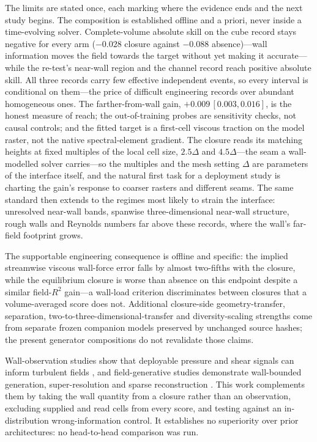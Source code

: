 The limits are stated once, each marking where the evidence ends and the next study begins. The
composition is established offline and a priori, never inside a time-evolving solver.
Complete-volume absolute skill on the cube record stays negative for every
arm ($-0.028$ closure against $-0.088$ absence)---wall information moves the field towards the
target without yet making it accurate---while the re-test's near-wall region and the channel
record reach positive absolute skill. All three records carry few effective independent events,
so every interval is conditional on them---the price of difficult engineering records over
abundant homogeneous ones. The farther-from-wall gain, $+0.009\,[0.003,0.016]$, is
the honest measure of reach; the out-of-training probes are sensitivity checks, not causal
controls; and the fitted target is a first-cell viscous traction on the model raster, not the
native spectral-element gradient. The closure reads its matching heights at fixed multiples of
the local cell size, $2.5\Delta$ and $4.5\Delta$---the seam a wall-modelled solver carries---so
the multiples and the mesh setting $\Delta$ are parameters of the interface itself, and the
natural first task for a deployment study is charting the gain's response to coarser rasters and
different seams. The same standard then extends to the regimes most likely to strain the
interface: unresolved near-wall bands, spanwise three-dimensional near-wall structure, rough
walls and Reynolds numbers far above these records, where the wall's far-field footprint
grows.

The supportable engineering consequence is offline and specific: the implied streamwise viscous
wall-force error falls by almost two-fifths with the closure, while the equilibrium closure is
worse than absence on this endpoint despite a similar field-$R^2$ gain---a wall-load criterion
discriminates between closures that a volume-averaged score does not. Additional closure-side
geometry-transfer, separation, two-to-three-dimensional-transfer and diversity-scaling strengths
come from separate frozen companion models preserved by unchanged source hashes; the present
generator compositions do not revalidate those claims.

Wall-observation studies show that deployable pressure and shear signals can inform turbulent
fields \cite{guemes2021coarse,cuellar2024three,parikh2026conditional}, and field-generative
studies demonstrate wall-bounded generation, super-resolution and sparse reconstruction
\cite{gao2023bayesian,du2024confild,oommen2026learning}. This work complements them by taking
the wall quantity from a closure rather than an observation, excluding supplied and read
cells from every score, and testing against an in-distribution wrong-information control. It
establishes no superiority over prior architectures: no head-to-head comparison was run.


